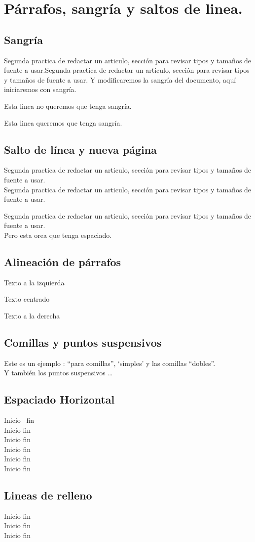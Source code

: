 \documentclass[10pt]{article}
\begin{document}
\section{Párrafos, sangría y saltos de linea.}
\subsection{Sangría}
Segunda practica de redactar un articulo, sección para revisar tipos y tamaños de fuente a usar.Segunda practica de redactar un articulo, sección para revisar tipos y tamaños de fuente a usar. Y modificaremos la sangría del documento, aquí iniciaremos con sangría. 

\noindent Esta linea no queremos que tenga sangría.

Esta linea queremos que tenga sangría.
\subsection{Salto de línea y nueva página}
Segunda practica de redactar un articulo, sección para revisar tipos y tamaños de fuente a usar.\\Segunda practica de redactar un articulo, sección para revisar tipos y tamaños de fuente a usar.
\par 
Segunda practica de redactar un articulo, sección para revisar tipos y tamaños de fuente a usar. \\[0.5cm]
Pero esta orea que tenga espaciado.
\subsection{Alineación de párrafos}
\begin{flushleft}
Texto a la izquierda
\end{flushleft}
\begin{center}
Texto centrado
\end{center}
\begin{flushright}
Texto a la derecha
\end{flushright}
\subsection{Comillas y puntos suspensivos}
Este es un ejemplo : ``para comillas'', `simples' y las comillas ``dobles''.\\
Y también los puntos suspensivos \dots
\subsection{Espaciado Horizontal}
\noindent Inicio \, fin\\[0.2 cm]
Inicio \quad fin\\[0.2 cm]
Inicio \qquad fin\\[0.2 cm]
Inicio \hspace{3cm} fin\\[0.2 cm]
Inicio \hspace{5cm} fin\\[0.2 cm]
Inicio \hfill fin\\[0.2 cm]
\subsection{Lineas de relleno}
\noindent Inicio \hfill fin\\[0.5cm]
Inicio \hrulefill fin\\[0.5cm]
Inicio \dotfill fin\\[0.5cm]
\end{document}
